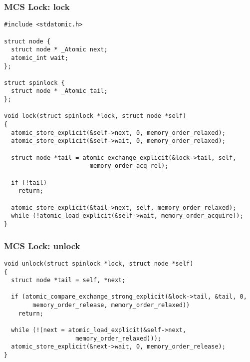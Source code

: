 \begin{frame}[fragile]
\frametitle{MCS Lock: lock}
\begin{lstlisting}
#include <stdatomic.h>

struct node {
  struct node * _Atomic next;
  atomic_int wait;
};

struct spinlock {
  struct node * _Atomic tail;
};

void lock(struct spinlock *lock, struct node *self)
{
  atomic_store_explicit(&self->next, 0, memory_order_relaxed);
  atomic_store_explicit(&self->wait, 0, memory_order_relaxed);

  struct node *tail = atomic_exchange_explicit(&lock->tail, self,
                        memory_order_acq_rel);

  if (!tail)
    return;

  atomic_store_explicit(&tail->next, self, memory_order_relaxed);
  while (!atomic_load_explicit(&self->wait, memory_order_acquire));
}
\end{lstlisting}
\end{frame}

\begin{frame}[fragile]
\frametitle{MCS Lock: unlock}
\begin{lstlisting}
void unlock(struct spinlock *lock, struct node *self)
{
  struct node *tail = self, *next;

  if (atomic_compare_exchange_strong_explicit(&lock->tail, &tail, 0,
        memory_order_release, memory_order_relaxed))
    return;

  while (!(next = atomic_load_explicit(&self->next,
                    memory_order_relaxed)));
  atomic_store_explicit(&next->wait, 0, memory_order_release);
}
\end{lstlisting}
\end{frame}

